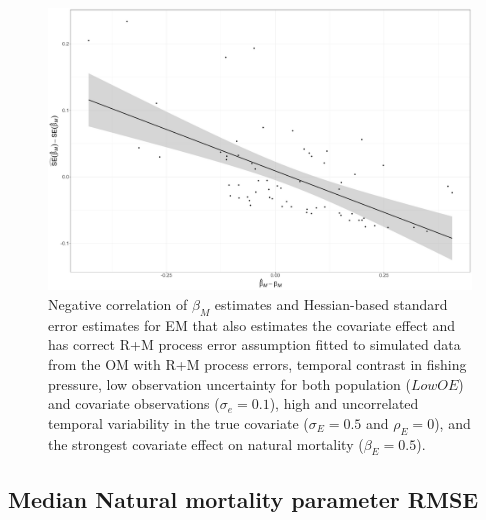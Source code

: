 \documentclass[
  12pt,
]{article}
\begin{document}
\begin{landscape}
\begin{figure}
\begin{center}
\includegraphics[height = \textheight]{om_69_em_5_beta_M_se_beta_M_lm_plot}
\end{center}
\caption{Negative correlation of $\beta_M$ estimates and Hessian-based standard error estimates for EM that also estimates the covariate effect and has correct R+M process error assumption fitted to simulated data from the OM with R+M process errors, temporal contrast in fishing pressure, low observation uncertainty for both population ($Low OE$) and covariate observations ($\sigma_e = 0.1$), high and uncorrelated temporal variability in the true covariate ($\sigma_E = 0.5$ and $\rho_E = 0$), and the strongest covariate effect on natural mortality ($\beta_E = 0.5$).}\label{ex_lm_beta_M_SE_beta_M}
\end{figure}
\end{landscape}

\hypertarget{median-natural-mortality-parameter-rmse}{%
\subsection*{Median Natural mortality parameter RMSE}\label{median-natural-mortality-parameter-rmse}}
\end{document}
